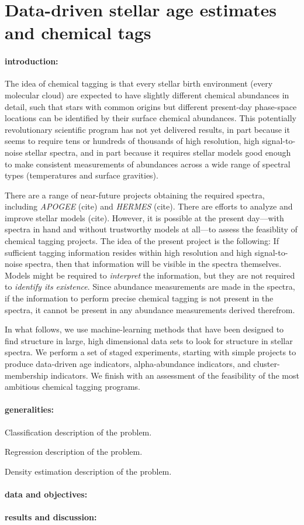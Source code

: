 \documentclass[12pt]{article}
\newcommand{\project}[1]{\textsl{#1}}
\begin{document}
\section*{Data-driven stellar age estimates and chemical tags}

\paragraph{introduction:}
The idea of chemical tagging is that every stellar birth environment
(every molecular cloud) are expected to have slightly different
chemical abundances in detail, such that stars with common origins but
different present-day phase-space locations can be identified by their
surface chemical abundances.  This potentially revolutionary
scientific program has not yet delivered results, in part because it
seems to require tens or hundreds of thousands of high resolution,
high signal-to-noise stellar spectra, and in part because it requires
stellar models good enough to make consistent measurements of
abundances across a wide range of spectral types (temperatures and
surface gravities).

There are a range of near-future projects obtaining the required
spectra, including \project{APOGEE} (cite) and \project{HERMES}
(cite).  There are efforts to analyze and improve stellar models
(cite).  However, it is possible at the present day---with spectra in
hand and without trustworthy models at all---to assess the feasiblity
of chemical tagging projects.  The idea of the present project is the
following: If sufficient tagging information resides within high
resolution and high signal-to-noise spectra, then that information
will be visible in the spectra themselves.  Models might be required
to \emph{interpret} the information, but they are not required to
\emph{identify its existence}.  Since abundance measurements are made
in the spectra, if the information to perform precise chemical tagging
is not present in the spectra, it cannot be present in any abundance
measurements derived therefrom.

In what follows, we use machine-learning methods that have been
designed to find structure in large, high dimensional data sets to
look for structure in stellar spectra.  We perform a set of staged
experiments, starting with simple projects to produce data-driven age
indicators, alpha-abundance indicators, and cluster-membership
indicators.  We finish with an assessment of the feasibility of the
most ambitious chemical tagging programs.

\paragraph{generalities:}
Classification description of the problem.

Regression description of the problem.

Density estimation description of the problem.

\paragraph{data and objectives:}

\paragraph{results and discussion:}
\end{document}

